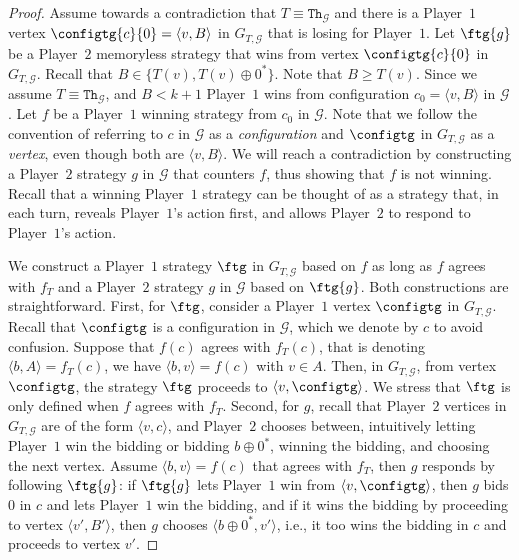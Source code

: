 \documentclass{article}\providecommand{\nequiv}{\not\equiv}\usepackage[a4paper,margin=20mm]{geometry}
\newcommand{\PO}{Player~$1$\xspace}
\newcommand{\PT}{Player~$2$\xspace}
\newcommand{\G}{{\mathcal G}}
\newcommand{\thresh}{\texttt{Th}\xspace}
\newcommand{\zug}[1]{\langle #1  \rangle}
\newcommand{\succb}[1]{#1 \oplus 0^*\xspace}
\begin{document}
\begin{proof}
Assume towards a contradiction that $T  \equiv \thresh_{\G}$ and there is a \PO vertex \(\configtg{c}{0} = \zug{v,B}\) in \(G_{T, \G}\) that is losing for \PO. 
Let \(\ftg{g}\) be a \PT memoryless strategy that wins from vertex $\configtg{c}{0}$ in \(G_{T, \G}\). 
Recall that \(B \in \{T(v), \succb{T(v)}\}\). 
Note that $B \geq T(v)$. Since we assume $T \equiv \thresh_\G$, and \(B < k+1\) \PO wins from configuration \(c_0 = \zug{v, B}\) in $\G$. Let \(f\) be a \PO winning strategy from \(c_0\) in \(\G\). Note that we follow the convention of referring to $c$ in $\G$ as a {\em configuration} and \(\configtg\) in $G_{T,\G}$ as a {\em vertex}, even though both are \(\zug{v, B}\). 
We will reach a contradiction by constructing a \PT strategy $g$ in $\G$ that counters $f$, thus showing that $f$ is not winning. 
Recall that a winning \PO strategy can be thought of as a strategy that, in each turn, reveals \PO's action first, and allows \PT to respond to \PO's action. 

We construct a \PO strategy $\ftg$ in $G_{T,\G}$ based on $f$ as long as $f$ agrees with $f_T$ and a \PT strategy $g$ in $\G$ based on $\ftg{g}$. Both constructions are straightforward. First, for $\ftg$, consider a \PO vertex $\configtg$ in $G_{T,\G}$. Recall that $\configtg$ is a configuration in $\G$, which we denote by $c$ to avoid confusion. Suppose that $f(c)$ agrees with $f_T(c)$, that is denoting $\zug{b, A} = f_T(c)$, we have $\zug{b, v} = f(c)$ with $v \in A$. 
Then, in $G_{T,\G}$, from vertex $\configtg$, the strategy $\ftg$ proceeds to $\zug{v, \configtg}$. We stress that $\ftg$ is only defined when $f$ agrees with $f_T$. 
Second, for $g$, recall that \PT vertices in $G_{T, \G}$ are of the form $\zug{v, c}$, and \PT chooses between, intuitively letting \PO win the bidding or bidding $\succb{b}$, winning the bidding, and choosing the next vertex. Assume $\zug{b, v} = f(c)$ that agrees with $f_T$, then $g$ responds by following $\ftg{g}$: if $\ftg{g}$ lets \PO win from $\zug{v, \configtg}$, then $g$ bids $0$ in $c$ and lets \PO win the bidding, and if it wins the bidding by proceeding to vertex $\zug{v', B'}$, then $g$ chooses $\zug{\succb{b}, v'}$, i.e., it too wins the bidding in $c$ and proceeds to vertex $v'$.


\end{proof}
\end{document}
